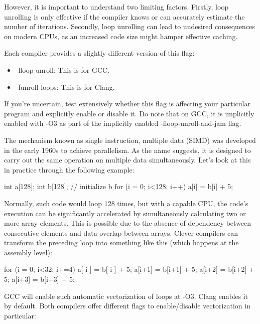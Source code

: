 However, it is important to understand two limiting factors. Firstly, loop unrolling is only effective if the compiler knows or can accurately estimate the number of iterations. Secondly, loop unrolling can lead to undesired consequences on modern CPUs, as an increased code size might hamper effective caching.

Each compiler provides a slightly different version of this flag:

\begin{itemize}
\item
-floop-unroll: This is for GCC.

\item
-funroll-loops: This is for Clang.
\end{itemize}

If you’re uncertain, test extensively whether this flag is affecting your particular program and explicitly enable or disable it. Do note that on GCC, it is implicitly enabled with -O3 as part of the implicitly enabled -floop-unroll-and-jam flag.


The mechanism known as single instruction, multiple data (SIMD) was developed in the early 1960s to achieve parallelism. As the name suggests, it is designed to carry out the same operation on multiple data simultaneously. Let’s look at this in practice through the following example:

\begin{cpp}
int a[128];
int b[128];
// initialize b
for (i = 0; i<128; i++)
    a[i] = b[i] + 5;
\end{cpp}

Normally, such code would loop 128 times, but with a capable CPU, the code’s execution can be significantly accelerated by simultaneously calculating two or more array elements. This is possible due to the absence of dependency between consecutive elements and data overlap between arrays. Clever compilers can transform the preceding loop into something like this (which happens at the assembly level):

\begin{cpp}
for (i = 0; i<32; i+=4) {
    a[ i ] = b[ i ] + 5;
    a[i+1] = b[i+1] + 5;
    a[i+2] = b[i+2] + 5;
    a[i+3] = b[i+3] + 5;
}
\end{cpp}

GCC will enable such automatic vectorization of loops at -O3. Clang enables it by default. Both compilers offer different flags to enable/disable vectorization in particular:

